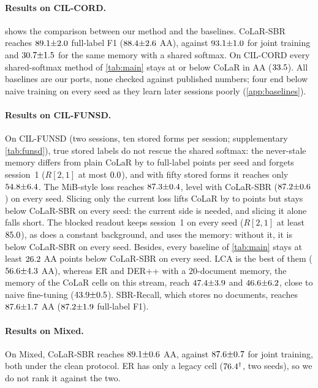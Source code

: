 \documentclass[10pt,twocolumn,letterpaper]{article}
\begin{document}
\paragraph{Results on CIL-CORD.}  shows the comparison between our method and the baselines. CoLaR-SBR reaches $89.1{\pm}2.0$ full-label F1 ($88.4{\pm}2.6$ AA), against $93.1{\pm}1.0$ for joint training and $30.7{\pm}1.5$ for the same memory with a shared softmax. On CIL-CORD every shared-softmax method of \cref{tab:main} stays at or below CoLaR in AA ($33.5$). All baselines are our ports, none checked against published numbers; four end below naive training on every seed as they learn later sessions poorly (\cref{app:baselines}).

\paragraph{Results on CIL-FUNSD.} On CIL-FUNSD (two sessions, ten stored forms per session; supplementary \cref{tab:funsd}), true stored labels do not rescue the shared softmax: the never-stale memory differs from plain CoLaR by \nFunsdOracleMinusColarFullMin{} to \nFunsdOracleMinusColarFullMax{} full-label points per seed and forgets session~1 ($R[2,1]$ at most $0.0$), and with fifty stored forms it reaches only $54.8{\pm}6.4$. The MiB-style loss reaches $87.3{\pm}0.4$, level with CoLaR-SBR ($87.2{\pm}0.6$) on every seed. Slicing only the current loss lifts CoLaR by \nFunsdCurSlicedMinusColarFullMin{} to \nFunsdCurSlicedMinusColarFullMax{} points but stays below CoLaR-SBR on every seed: the current side is needed, and slicing it alone falls short. The blocked readout keeps session~1 on every seed ($R[2,1]$ at least $85.0$), as does a constant background, and uses the memory: without it, it is below CoLaR-SBR on every seed. Besides, every baseline of \cref{tab:main} stays at least $26.2$ AA points below CoLaR-SBR on every seed. LCA is the best of them ($56.6{\pm}4.3$ AA), whereas ER and DER++ with a $20$-document memory, the memory of the CoLaR cells on this stream, reach $47.4{\pm}3.9$ and $46.6{\pm}6.2$, close to naive fine-tuning ($43.9{\pm}0.5$). SBR-Recall, which stores no documents, reaches $87.6{\pm}1.7$ AA ($87.2{\pm}1.9$ full-label F1).

\paragraph{Results on Mixed.} On Mixed, CoLaR-SBR reaches $89.1{\pm}0.6$ AA, against $87.6{\pm}0.7$ for joint training, both under the clean protocol. ER has only a legacy cell ($76.4^\dagger$, two seeds), so we do not rank it against the two.
\end{document}
